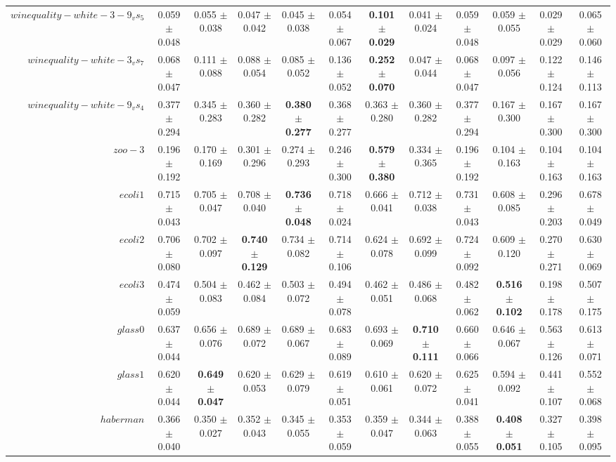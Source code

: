 \begin{table}[!ht]
{\begin{tabular}{r c c c c c c c c c c c}
$winequality-white-3-9_vs_5$ & 0.059 $\pm$ 0.048 & 0.055 $\pm$ 0.038 & 0.047 $\pm$ 0.042 & 0.045 $\pm$ 0.038 & 0.054 $\pm$ 0.067 & \textbf{0.101 $\pm$ 0.029} & 0.041 $\pm$ 0.024 & 0.059 $\pm$ 0.048 & 0.059 $\pm$ 0.055 & 0.029 $\pm$ 0.029 & 0.065 $\pm$ 0.060 \\
$winequality-white-3_vs_7$ & 0.068 $\pm$ 0.047 & 0.111 $\pm$ 0.088 & 0.088 $\pm$ 0.054 & 0.085 $\pm$ 0.052 & 0.136 $\pm$ 0.052 & \textbf{0.252 $\pm$ 0.070} & 0.047 $\pm$ 0.044 & 0.068 $\pm$ 0.047 & 0.097 $\pm$ 0.056 & 0.122 $\pm$ 0.124 & 0.146 $\pm$ 0.113 \\
$winequality-white-9_vs_4$ & 0.377 $\pm$ 0.294 & 0.345 $\pm$ 0.283 & 0.360 $\pm$ 0.282 & \textbf{0.380 $\pm$ 0.277} & 0.368 $\pm$ 0.277 & 0.363 $\pm$ 0.280 & 0.360 $\pm$ 0.282 & 0.377 $\pm$ 0.294 & 0.167 $\pm$ 0.300 & 0.167 $\pm$ 0.300 & 0.167 $\pm$ 0.300 \\
$zoo-3$ & 0.196 $\pm$ 0.192 & 0.170 $\pm$ 0.169 & 0.301 $\pm$ 0.296 & 0.274 $\pm$ 0.293 & 0.246 $\pm$ 0.300 & \textbf{0.579 $\pm$ 0.380} & 0.334 $\pm$ 0.365 & 0.196 $\pm$ 0.192 & 0.104 $\pm$ 0.163 & 0.104 $\pm$ 0.163 & 0.104 $\pm$ 0.163 \\
$ecoli1$ & 0.715 $\pm$ 0.043 & 0.705 $\pm$ 0.047 & 0.708 $\pm$ 0.040 & \textbf{0.736 $\pm$ 0.048} & 0.718 $\pm$ 0.024 & 0.666 $\pm$ 0.041 & 0.712 $\pm$ 0.038 & 0.731 $\pm$ 0.043 & 0.608 $\pm$ 0.085 & 0.296 $\pm$ 0.203 & 0.678 $\pm$ 0.049 \\
$ecoli2$ & 0.706 $\pm$ 0.080 & 0.702 $\pm$ 0.097 & \textbf{0.740 $\pm$ 0.129} & 0.734 $\pm$ 0.082 & 0.714 $\pm$ 0.106 & 0.624 $\pm$ 0.078 & 0.692 $\pm$ 0.099 & 0.724 $\pm$ 0.092 & 0.609 $\pm$ 0.120 & 0.270 $\pm$ 0.271 & 0.630 $\pm$ 0.069 \\
$ecoli3$ & 0.474 $\pm$ 0.059 & 0.504 $\pm$ 0.083 & 0.462 $\pm$ 0.084 & 0.503 $\pm$ 0.072 & 0.494 $\pm$ 0.078 & 0.462 $\pm$ 0.051 & 0.486 $\pm$ 0.068 & 0.482 $\pm$ 0.062 & \textbf{0.516 $\pm$ 0.102} & 0.198 $\pm$ 0.178 & 0.507 $\pm$ 0.175 \\
$glass0$ & 0.637 $\pm$ 0.044 & 0.656 $\pm$ 0.076 & 0.689 $\pm$ 0.072 & 0.689 $\pm$ 0.067 & 0.683 $\pm$ 0.089 & 0.693 $\pm$ 0.069 & \textbf{0.710 $\pm$ 0.111} & 0.660 $\pm$ 0.066 & 0.646 $\pm$ 0.067 & 0.563 $\pm$ 0.126 & 0.613 $\pm$ 0.071 \\
$glass1$ & 0.620 $\pm$ 0.044 & \textbf{0.649 $\pm$ 0.047} & 0.620 $\pm$ 0.053 & 0.629 $\pm$ 0.079 & 0.619 $\pm$ 0.051 & 0.610 $\pm$ 0.061 & 0.620 $\pm$ 0.072 & 0.625 $\pm$ 0.041 & 0.594 $\pm$ 0.092 & 0.441 $\pm$ 0.107 & 0.552 $\pm$ 0.068 \\
$haberman$ & 0.366 $\pm$ 0.040 & 0.350 $\pm$ 0.027 & 0.352 $\pm$ 0.043 & 0.345 $\pm$ 0.055 & 0.353 $\pm$ 0.059 & 0.359 $\pm$ 0.047 & 0.344 $\pm$ 0.063 & 0.388 $\pm$ 0.055 & \textbf{0.408 $\pm$ 0.051} & 0.327 $\pm$ 0.105 & 0.398 $\pm$ 0.095 \\

\end{tabular}}
\end{table}
